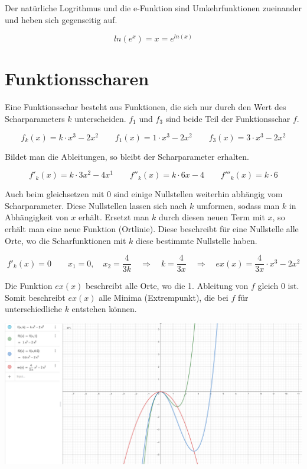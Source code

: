 Der natürliche Logrithmus und die e-Funktion sind Umkehrfunktionen zueinander und heben
sich gegenseitig auf.

\begin{equation*}
    ln(e^x) = x = e^{ln(x)}
\end{equation*}

\section{Funktionsscharen}

Eine Funktionsschar besteht aus Funktionen, die sich nur durch den Wert des
Scharparameters $k$ unterscheiden. $f_1$ und $f_3$ sind beide Teil der Funktionsschar
$f$.

\begin{equation*}
    f_k(x) = k \cdot x^3 - 2x^2 \qquad f_1(x) = 1 \cdot x^3 - 2x^2 \qquad f_3(x) = 3 \cdot x^3 - 2x^2
\end{equation*}

Bildet man die Ableitungen, so bleibt der Scharparameter erhalten.

\begin{equation*}
    f'_{k}(x) = k \cdot 3x^2 - 4x^1 \qquad f''_{k}(x) = k \cdot 6x - 4 \qquad f'''_{k}(x) = k \cdot 6
\end{equation*}

Auch beim gleichsetzen mit $0$ sind einige Nullstellen weiterhin abhängig vom Scharparameter.
Diese Nullstellen lassen sich nach $k$ umformen, sodass man $k$ in Abhängigkeit von $x$ erhält.
Ersetzt man $k$ durch diesen neuen Term mit $x$, so erhält man eine neue Funktion (Ortlinie).
Diese beschreibt für eine Nullstelle alle Orte, wo die Scharfunktionen mit $k$ diese
bestimmte Nullstelle haben.

\begin{equation*}
    f'_k(x) = 0 \qquad x_1 = 0, \quad x_2 = \frac{4}{3k} \quad \Rightarrow \quad k = \frac{4}{3x} \quad \Rightarrow \quad ex(x) = \frac{4}{3x} \cdot x^3 - 2x^2
\end{equation*}

Die Funktion $ex(x)$ beschreibt alle Orte, wo die 1. Ableitung von $f$ gleich $0$ ist.
Somit beschreibt $ex(x)$ alle Minima (Extrempunkt), die bei $f$ für unterschiedliche $k$ entstehen können.

\begin{center}
    \includegraphics[width=1.0\textwidth]{images/2d-f-schar-example.png}
\end{center}

